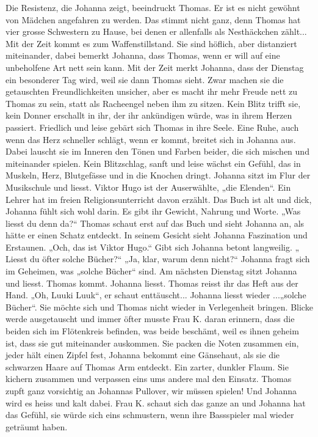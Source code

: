 Die Resistenz, die Johanna zeigt, beeindruckt Thomas. Er ist es nicht gewöhnt von Mädchen angefahren zu werden. Das stimmt nicht ganz, denn Thomas hat vier grosse Schwestern zu Hause, bei denen er allenfalls als Nesthäckchen zählt... Mit der Zeit kommt es zum Waffenstillstand. Sie sind höflich, aber distanziert miteinander, dabei bemerkt Johanna, dass Thomas, wenn er will auf eine unbeholfene Art nett sein kann.
Mit der Zeit merkt Johanna, dass der Dienstag ein besonderer Tag wird, weil sie dann Thomas sieht. Zwar machen sie die getauschten Freundlichkeiten unsicher, aber es macht ihr mehr Freude nett zu Thomas zu sein, statt als Racheengel neben ihm zu sitzen. Kein Blitz trifft sie, kein Donner erschallt in ihr, der ihr ankündigen würde, was in ihrem Herzen passiert. Friedlich und leise gebärt sich Thomas in ihre Seele. Eine Ruhe, auch wenn das Herz schneller schlägt, wenn er kommt, breitet sich in Johanna aus. Dabei lauscht sie im Inneren den Tönen und Farben beider, die sich mischen und miteinander spielen. Kein Blitzschlag, sanft und leise wächst ein Gefühl, das in Muskeln, Herz, Blutgefässe und in die Knochen dringt.
Johanna sitzt im Flur der Musikschule und liesst. Viktor Hugo ist der Auserwählte, „die Elenden“. Ein Lehrer hat im freien Religionsunterricht davon erzählt. Das Buch ist alt und dick, Johanna fühlt sich wohl darin. Es gibt ihr Gewicht, Nahrung und Worte.
 „Was liesst du denn da?“ Thomas schaut erst auf das Buch und sieht Johanna an, als hätte er einen Schatz entdeckt. In seinem Gesicht sieht Johanna Faszination und Erstaunen. „Och, das ist Viktor Hugo.“ Gibt sich Johanna betont langweilig. „ Liesst du öfter solche Bücher?“  „Ja, klar, warum denn nicht?“ Johanna fragt sich im Geheimen, was „solche Bücher“ sind. 
Am nächsten Dienstag sitzt Johanna und liesst. Thomas kommt. Johanna liesst. Thomas reisst ihr das Heft aus der Hand. „Oh, Luuki Luuk“, er schaut enttäuscht... Johanna liesst wieder ...„solche Bücher“. Sie möchte sich und Thomas nicht wieder in Verlegenheit bringen. 
Blicke werde ausgetauscht und immer öfter musste Frau K. daran erinnern, dass die beiden sich im Flötenkreis befinden, was beide beschämt, weil es ihnen geheim ist, dass sie gut miteinander auskommen.
Sie packen die Noten zusammen ein, jeder hält einen Zipfel fest, Johanna bekommt eine Gänsehaut, als sie die schwarzen Haare auf Thomas Arm entdeckt. Ein zarter, dunkler Flaum. Sie kichern zusammen und verpassen eins ums andere mal den Einsatz. Thomas zupft ganz vorsichtig an Johannas Pullover, wir müssen spielen! Und Johanna wird es heiss und kalt dabei. Frau K. schaut sich das ganze an und Johanna hat das Gefühl, sie würde sich eins schmustern, wenn ihre Bassspieler mal wieder geträumt haben. 

